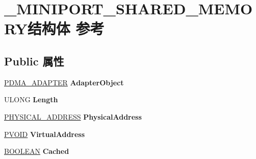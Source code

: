 \hypertarget{struct___m_i_n_i_p_o_r_t___s_h_a_r_e_d___m_e_m_o_r_y}{}\section{\+\_\+\+M\+I\+N\+I\+P\+O\+R\+T\+\_\+\+S\+H\+A\+R\+E\+D\+\_\+\+M\+E\+M\+O\+R\+Y结构体 参考}
\label{struct___m_i_n_i_p_o_r_t___s_h_a_r_e_d___m_e_m_o_r_y}
\subsection*{Public 属性}
\begin{DoxyCompactItemize}
\item 
\mbox{\label{struct___m_i_n_i_p_o_r_t___s_h_a_r_e_d___m_e_m_o_r_y_aba04920f29414357af8cdc1ed4f255b0}} 
\hyperlink{struct___d_m_a___a_d_a_p_t_e_r}{P\+D\+M\+A\+\_\+\+A\+D\+A\+P\+T\+ER} {\bfseries Adapter\+Object}
\item 
\mbox{\label{struct___m_i_n_i_p_o_r_t___s_h_a_r_e_d___m_e_m_o_r_y_a27b470d148e4052d7db8a9eae06134ec}} 
U\+L\+O\+NG {\bfseries Length}
\item 
\mbox{\label{struct___m_i_n_i_p_o_r_t___s_h_a_r_e_d___m_e_m_o_r_y_a43ae6c9db6346a94080a7c57b4d173a3}} 
\hyperlink{union___l_a_r_g_e___i_n_t_e_g_e_r}{P\+H\+Y\+S\+I\+C\+A\+L\+\_\+\+A\+D\+D\+R\+E\+SS} {\bfseries Physical\+Address}
\item 
\mbox{\label{struct___m_i_n_i_p_o_r_t___s_h_a_r_e_d___m_e_m_o_r_y_a096c7302f269eef5b18c8cba106113fd}} 
\hyperlink{interfacevoid}{P\+V\+O\+ID} {\bfseries Virtual\+Address}
\item 
\mbox{\label{struct___m_i_n_i_p_o_r_t___s_h_a_r_e_d___m_e_m_o_r_y_a13b10e2cf821cf45a19427bd0baab767}} 
\hyperlink{_processor_bind_8h_a112e3146cb38b6ee95e64d85842e380a}{B\+O\+O\+L\+E\+AN} {\bfseries Cached}
\item 
\mbox{\label{struct___m_i_n_i_p_o_r_t___s_h_a_r_e_d___m_e_m_o_r_y_a18aae069f935c63c02ab9538236c4cce}} 

\end{DoxyCompactItemize}
